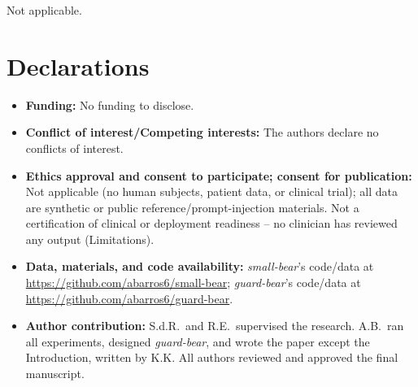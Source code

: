 \documentclass[pdflatex,sn-mathphys-num]{sn-jnl-official}%
\begin{document}

Not applicable.

\section*{Declarations}

\begin{itemize}
\item \textbf{Funding:} No funding to disclose.
\item \textbf{Conflict of interest/Competing interests:} The authors declare no conflicts of interest.
\item \textbf{Ethics approval and consent to participate; consent for publication:} Not applicable (no human subjects, patient data, or clinical trial); all data are synthetic or public reference/prompt-injection materials. Not a certification of clinical or deployment readiness -- no clinician has reviewed any output (Limitations).
\item \textbf{Data, materials, and code availability:} \textit{small-bear}'s code/data at \url{https://github.com/abarros6/small-bear}; \textit{guard-bear}'s code/data at \url{https://github.com/abarros6/guard-bear}.
\item \textbf{Author contribution:} S.d.R.\ and R.E.\ supervised the research. A.B.\ ran all experiments, designed \textit{guard-bear}, and wrote the paper except the Introduction, written by K.K. All authors reviewed and approved the final manuscript.
\end{itemize}


\end{document}
